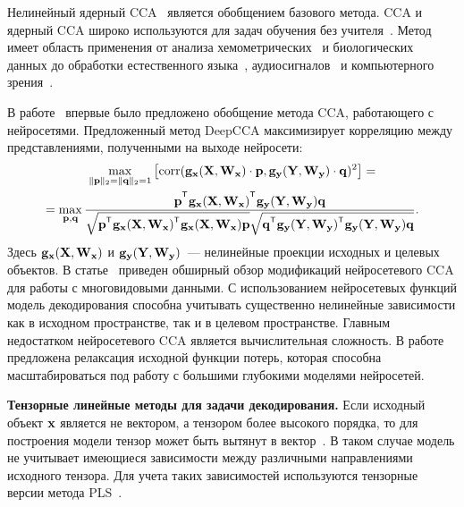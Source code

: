 \documentclass[11pt, a5paper]{dissert}
\begin{document}
Нелинейный ядерный CCA~\cite{akaho2006kernel,melzer2001nonlinear,bach2002kernel,hardoon2004canonical} является обобщением базового метода. 
CCA и ядерный CCA широко используются для задач обучения без учителя~\cite{hardoon2007unsupervised,vinokourov2003inferring}. 
Метод имеет область применения от анализа хемометрических~\cite{montanarella1995chemometric} и биологических~\cite{vert2003graph} данных до обработки естественного языка~\cite{haghighi2008learning,dhillon2011multi}, аудиосигналов~\cite{choukri1986adaptation,rudzicz2010adaptive} и компьютерного зрения~\cite{kim2007tensor}.

В работе~\cite{andrew2013deep} впервые было предложено обобщение метода CCA, работающего с нейросетями. 
Предложенный метод DeepCCA максимизирует корреляцию между представлениями, полученными на выходе нейросети:
\begin{multline}
	\max_{\|\bp\|_{2}=\|\bq\|_{2}=1}\left[ \text{corr}(\mathbf{g}_{\bx}(\bX, \bW_{\bx}) \cdot \bp, \mathbf{g}_{\by}(\bY, \bW_{\by}) \cdot \bq)^{2}\right] = \\ = \max_{\bp, \bq} \frac{\bp^{\T} \mathbf{g}_{\bx}(\bX, \bW_{\bx})^{\T} \mathbf{g}_{\by}(\bY, \bW_{\by}) \bq}{\sqrt{\bp^{\T} \mathbf{g}_{\bx}(\bX, \bW_{\bx})^{\T}  \mathbf{g}_{\bx}(\bX, \bW_{\bx}) \bp} \sqrt{\bq^{\T} \mathbf{g}_{\by}(\bY, \bW_{\by})^{\T}  \mathbf{g}_{\by}(\bY, \bW_{\by}) \bq}}.
	\label{ch1:eq:depp_cca_max_corr}
\end{multline}
Здесь $\mathbf{g}_{\mathbf{x}}(\mathbf{X}, \mathbf{W}_{\mathbf{x}})$ и $\mathbf{g}_{\mathbf{y}}(\mathbf{Y}, \mathbf{W}_{\mathbf{y}})$~--- нелинейные проекции исходных и целевых объектов.
В статье~\cite{wang2015deep} приведен обширный обзор модификаций нейросетевого CCA для работы с многовидовыми данными.
С использованием нейросетевых функций модель декодирования способна учитывать существенно нелинейные зависимости как в исходном пространстве, так и в целевом пространстве.
Главным недостатком нейросетевого CCA является вычислительная сложность. 
В работе~\cite{chang2018scalable} предложена релаксация исходной функции потерь, которая способна масштабироваться под работу с большими глубокими моделями нейросетей.

\vspace{0.5cm}
\textbf{Тензорные линейные методы для задачи декодирования.}
Если исходный объект $\mathbf{x}$ является не вектором, а тензором более высокого порядка, то для построения модели тензор может быть вытянут в вектор~\cite{cichocki2009nonnegative}. 
В таком случае модель не учитывает имеющиеся зависимости между различными направлениями исходного тензора.
Для учета таких зависимостей используются тензорные версии метода PLS~\cite{zhao2012higher,eliseyev2013recursive,eliseyev2016penalized}.
\end{document}
